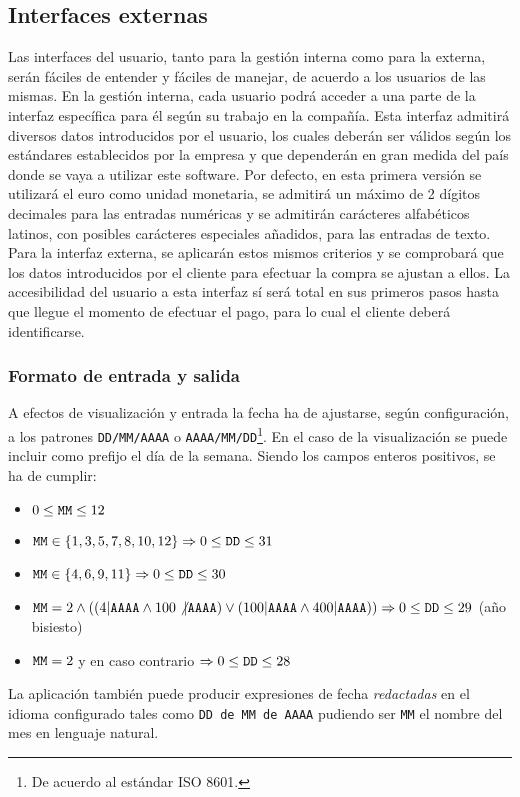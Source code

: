 \documentclass[11pt, a4paper, twoside]{report}
\begin{document}
		\subsection{Interfaces externas}
			Las interfaces del usuario, tanto para la gestión interna como para la externa, serán fáciles de entender y fáciles de manejar, de acuerdo a los usuarios de las mismas. En la gestión interna, cada usuario podrá acceder a una parte de la interfaz específica para él según su trabajo en la compañía. Esta interfaz admitirá diversos datos introducidos por el usuario, los cuales deberán ser válidos según los estándares establecidos por la empresa y que dependerán en gran medida del país donde se vaya a utilizar este software. Por defecto, en esta primera versión se utilizará el euro como unidad monetaria, se admitirá un máximo de 2 dígitos decimales para las entradas numéricas y se admitirán carácteres alfabéticos latinos, con posibles carácteres especiales añadidos, para las entradas de texto. Para la interfaz externa, se aplicarán estos mismos criterios y se comprobará que los datos introducidos por el cliente para efectuar la compra se ajustan a ellos. La accesibilidad del usuario a esta interfaz sí será total en sus primeros pasos hasta que llegue el momento de efectuar el pago, para lo cual el cliente deberá identificarse.

		\subsubsection{Formato de entrada y salida}

				A efectos de visualización y entrada la fecha ha de ajustarse, según configuración, a los patrones \verb|DD/MM/AAAA| o \verb|AAAA/MM/DD|\footnote{De acuerdo al estándar ISO 8601.}. En el caso de la visualización se puede incluir como prefijo el día de la semana. Siendo los campos enteros positivos, se ha de cumplir:
				\begin{itemize}
					\item $0 \leq \verb|MM| \leq 12$
					\item $\verb|MM| \in \{1, 3, 5, 7, 8, 10, 12\} \Rightarrow 0 \leq \verb|DD| \leq 31$
					\item $\verb|MM| \in \{4, 6, 9, 11\} \Rightarrow 0 \leq \verb|DD| \leq 30$ 
					\item $\verb|MM| = 2 \wedge ((4 | \verb|AAAA| \wedge 100 \not| \verb|AAAA|) \vee (100 | \verb|AAAA| \wedge 400 | \verb|AAAA|)) \Rightarrow 0 \leq \verb|DD| \leq 29$ (año bisiesto)
					\item $\verb|MM| = 2$ y en caso contrario $\Rightarrow 0 \leq \verb|DD| \leq 28$
				\end{itemize}
			La aplicación también puede producir expresiones de fecha \textit{redactadas} en el idioma configurado tales como \verb|DD de MM de AAAA| pudiendo ser \verb|MM| el nombre del mes en lenguaje natural.\\
\end{document}
